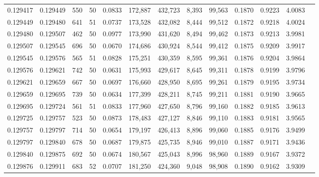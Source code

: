 \begin{tabular}{rrrrrrrrrrrrr}
0.129417 & 0.129449 &   550 &  50 &                                     0.0833 & 172,887 & 432,723 &   8,393 &  99,563 & 0.1870 & 0.9223 & 4.0083 \\
0.129449 & 0.129480 &   641 &  51 &                                     0.0737 & 173,528 & 432,082 &   8,444 &  99,512 & 0.1872 & 0.9218 & 4.0024 \\
0.129480 & 0.129507 &   462 &  50 &                                     0.0977 & 173,990 & 431,620 &   8,494 &  99,462 & 0.1873 & 0.9213 & 3.9981 \\
0.129507 & 0.129545 &   696 &  50 &                                     0.0670 & 174,686 & 430,924 &   8,544 &  99,412 & 0.1875 & 0.9209 & 3.9917 \\
0.129545 & 0.129576 &   565 &  51 &                                     0.0828 & 175,251 & 430,359 &   8,595 &  99,361 & 0.1876 & 0.9204 & 3.9864 \\
0.129576 & 0.129621 &   742 &  50 &                                     0.0631 & 175,993 & 429,617 &   8,645 &  99,311 & 0.1878 & 0.9199 & 3.9796 \\
0.129621 & 0.129659 &   667 &  50 &                                     0.0697 & 176,660 & 428,950 &   8,695 &  99,261 & 0.1879 & 0.9195 & 3.9734 \\
0.129659 & 0.129695 &   739 &  50 &                                     0.0634 & 177,399 & 428,211 &   8,745 &  99,211 & 0.1881 & 0.9190 & 3.9665 \\
0.129695 & 0.129724 &   561 &  51 &                                     0.0833 & 177,960 & 427,650 &   8,796 &  99,160 & 0.1882 & 0.9185 & 3.9613 \\
0.129725 & 0.129757 &   523 &  50 &                                     0.0873 & 178,483 & 427,127 &   8,846 &  99,110 & 0.1883 & 0.9181 & 3.9565 \\
0.129757 & 0.129797 &   714 &  50 &                                     0.0654 & 179,197 & 426,413 &   8,896 &  99,060 & 0.1885 & 0.9176 & 3.9499 \\
0.129797 & 0.129840 &   678 &  50 &                                     0.0687 & 179,875 & 425,735 &   8,946 &  99,010 & 0.1887 & 0.9171 & 3.9436 \\
0.129840 & 0.129875 &   692 &  50 &                                     0.0674 & 180,567 & 425,043 &   8,996 &  98,960 & 0.1889 & 0.9167 & 3.9372 \\
0.129876 & 0.129911 &   683 &  52 &                                     0.0707 & 181,250 & 424,360 &   9,048 &  98,908 & 0.1890 & 0.9162 & 3.9309 \\

\end{tabular}
